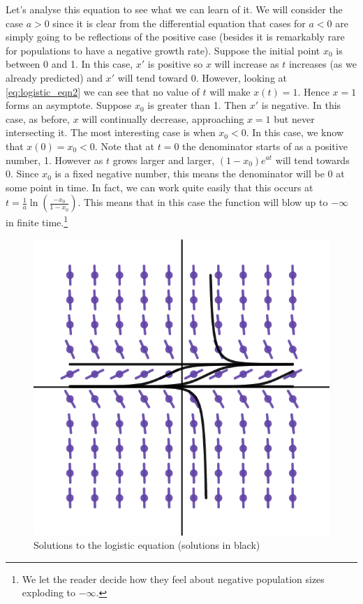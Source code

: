 Let's analyse this equation to see what we can learn of it. We will consider the case $a > 0$ since it is clear from the differential equation that cases for $a < 0$ are simply going to be reflections of the positive case (besides it is remarkably rare for populations to have a negative growth rate). Suppose the initial point $x_0$ is between 0 and 1. In this case, $x'$ is positive so $x$ will increase as $t$ increases (as we already predicted) and $x'$ will tend toward 0. However, looking at \autoref{eq:logistic_eqn2} we can see that no value of $t$ will make $x(t) = 1$. Hence $x = 1$ forms an asymptote. Suppose $x_0$ is greater than 1. Then $x'$ is negative. In this case, as before, $x$ will continually decrease, approaching $x = 1$ but never intersecting it. The most interesting case is when $x_0 < 0$. In this case, we know that $x(0) = x_0 < 0$. Note that at $t = 0$ the denominator starts of as a positive number, 1. However as $t$ grows larger and larger, $(1 - x_0) e^{at}$ will tend towards 0. Since $x_0$ is a fixed negative number, this means the denominator will be 0 at some point in time. In fact, we can work quite easily that this occurs at $t = \frac{1}{a}\ln(\frac{-x_0}{1 - x_0})$. This means that in this case the function will blow up to $-\infty$ in finite time.\footnote{We let the reader decide how they feel about negative population sizes exploding to $-\infty$.}

\begin{figure}[h]
    \centering
    \includegraphics[scale=0.4]{Images/logistic_eqn_soln.png}
    \caption{Solutions to the logistic equation (solutions in black)}
    \label{fig:logistic_eqn_solns}
\end{figure}

